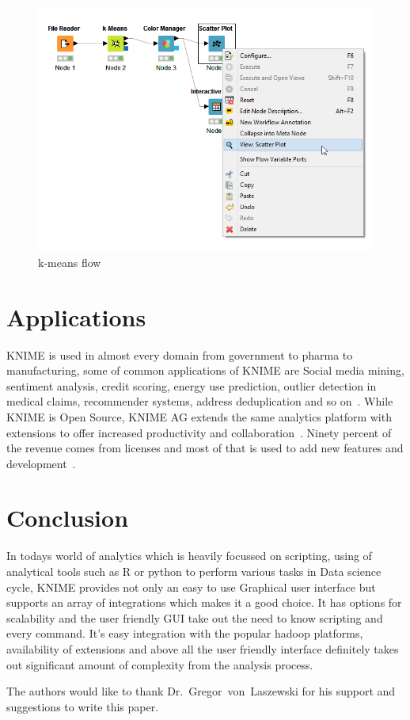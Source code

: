 \begin{figure}[!ht]
	\centering\includegraphics[width=\columnwidth]{../images/kmeans_flow.png}
	\caption{k-means flow~\cite{hid-sp18-517-wf}}
 	\label{fig:kmean}
\end{figure}


\section{Applications}

KNIME is used in almost every domain from government to pharma to 
manufacturing, some of common applications of KNIME are Social 
media mining, sentiment analysis, credit scoring, energy use 
prediction, outlier detection in medical claims, recommender systems, 
address deduplication and so on~\cite{hid-sp18-517-applications}.
While KNIME is Open Source, KNIME AG extends the same analytics platform
with extensions to offer increased productivity and collaboration~\cite{hid-sp18-517-opensource}.
Ninety percent of the revenue comes from licenses and most of that 
is used to add new features and development~\cite{hid-sp18-517-opensource}.

\section{Conclusion}

In todays world of analytics which is heavily focussed on scripting, 
using of analytical tools such as R or python to perform various 
tasks in Data science cycle, KNIME provides not only an easy to 
use Graphical user interface but supports an array of
integrations which makes it a good choice. It has options for
scalability and the user friendly GUI take out the need to know
scripting and every command. It's easy integration with the 
popular hadoop platforms, availability of extensions and above all 
the user friendly interface definitely takes out significant amount
of complexity from the analysis process.

\begin{acks}

  The authors would like to thank Dr.~Gregor~von~Laszewski for his
  support and suggestions to write this paper.

\end{acks}


 

